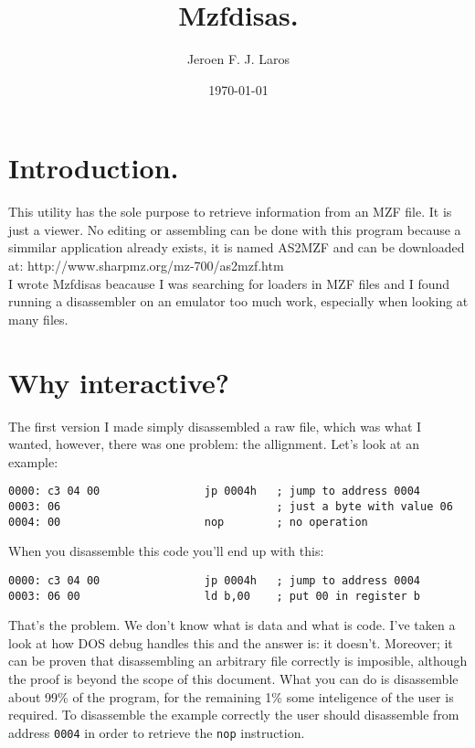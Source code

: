 \documentclass{article}
\title{\Huge Mzfdisas.}
\author{Jeroen F. J. Laros}
\date{\today}
\begin{document}
\maketitle
\newpage

\tableofcontents
\newpage

\section{Introduction.}
This utility has the sole purpose to retrieve information from an MZF file. It
is just a viewer. No editing or assembling can be done with this program 
because a simmilar application already exists, it is named AS2MZF and can be
downloaded at: http://www.sharpmz.org/mz-700/as2mzf.htm \\
I wrote Mzfdisas beacause I was searching for loaders in MZF files and I found
running a disassembler on an emulator too much work, especially when looking
at many files.

\section{Why interactive?}
The first version I made simply disassembled a raw file, which was what I 
wanted, however, there was one problem: the allignment. Let's look at an
example: \begin{verbatim} 
0000: c3 04 00                jp 0004h   ; jump to address 0004
0003: 06                                 ; just a byte with value 06
0004: 00                      nop        ; no operation
\end{verbatim} When you disassemble this code you'll end up with this:
\begin{verbatim} 
0000: c3 04 00                jp 0004h   ; jump to address 0004
0003: 06 00                   ld b,00    ; put 00 in register b
\end{verbatim} That's the problem. We don't know what is data and what is code.
I've taken a look at how DOS debug handles this and the answer is: it doesn't.
Moreover; it can be proven that disassembling an arbitrary file correctly is 
imposible, although the proof is beyond the scope of this document. What you 
can do is disassemble about 99\% of the program, for the remaining 1\% some 
inteligence of the user is required. To disassemble the example correctly the
user should disassemble from address \verb+0004+ in order to retrieve the 
\verb+nop+ instruction.
\end{document}

